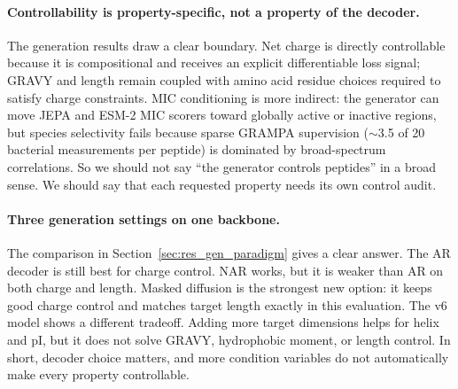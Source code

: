 \paragraph{Controllability is property-specific, not a property of the decoder.}
The generation results draw a clear boundary.
Net charge is directly controllable because it is compositional and receives an
explicit differentiable loss signal; GRAVY and length remain coupled with amino
acid residue choices required to satisfy charge constraints.
MIC conditioning is more indirect: the generator can move JEPA and ESM-2 MIC
scorers toward globally active or inactive regions, but species selectivity fails
because sparse GRAMPA supervision ($\sim$3.5 of 20 bacterial measurements per
peptide) is dominated by broad-spectrum correlations.
So we should not say ``the generator controls peptides'' in a broad sense.
We should say that each requested property needs its own control audit.

\paragraph{Three generation settings on one backbone.}
The comparison in Section~\ref{sec:res_gen_paradigm} gives a clear answer.
The AR decoder is still best for charge control.
NAR works, but it is weaker than AR on both charge and length.
Masked diffusion is the strongest new option: it keeps good charge control and
matches target length exactly in this evaluation.
The v6 model shows a different tradeoff.
Adding more target dimensions helps for helix and pI, but it does not solve
GRAVY, hydrophobic moment, or length control.
In short, decoder choice matters, and more condition variables do not
automatically make every property controllable.

